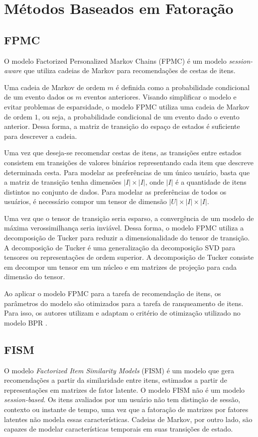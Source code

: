 \section{Métodos Baseados em Fatoração}

\subsection{FPMC}
O modelo Factorized Personalized Markov Chains (FPMC) é um modelo \textit{session-aware}
que utiliza cadeias de Markov para recomendações de cestas de itens. \cite{mkv}

Uma cadeia de Markov de ordem $m$ é definida como a probabilidade condicional de
um evento dados os $m$ eventos anteriores. Visando simplificar o modelo e evitar
problemas de esparsidade, o modelo FPMC utiliza uma cadeia de Markov de ordem
$1$, ou seja, a probabilidade condicional de um evento dado o evento anterior.
Dessa forma, a matriz de transição do espaço de estados é suficiente para
descrever a cadeia.

Uma vez que deseja-se recomendar cestas de itens, as transições entre estados
consistem em transições de valores binários representando cada item que descreve
determinada cesta. Para modelar as preferências de um único usuário, basta que a
matriz de transição tenha dimensões $|I| \times |I|$, onde $|I|$ é a quantidade
de itens distintos no conjunto de dados. Para modelar as preferências de todos
os usuários, é necessário compor um tensor de dimensão $|U|
\times |I| \times |I|$.

Uma vez que o tensor de transição seria esparso, a convergência de um modelo de
máxima verossimilhança seria inviável. Dessa forma, o modelo FPMC utiliza a
decomposição de Tucker para reduzir a dimensionalidade do tensor de transição. A
decomposição de Tucker é uma generalização da decomposição SVD para tensores ou
representações de ordem superior. A decomposição de Tucker consiste em decompor
um tensor em um núcleo e em matrizes de projeção para cada dimensão do tensor.

Ao aplicar o modelo FPMC para a tarefa de recomendação de itens, os parâmetros
do modelo são otimizados para a tarefa de ranqueamento de itens. Para isso, os
autores utilizam e adaptam o critério de otimização utilizado no modelo BPR
\cite{rendle2009}.

\subsection{FISM}
O modelo \textit{Factorized Item Similarity Models} (FISM) \cite{kabbur2013fism}
é um modelo que gera recomendações a partir da similaridade entre itens,
estimados a partir de representações em matrizes de fator latente. O modelo FISM
não é um modelo \textit{session-based}. Os itens avaliados por um usuário não
tem distinção de sessão, contexto ou instante de tempo, uma vez que a fatoração
de matrizes por fatores latentes não modela essas características. Cadeias de
Markov, por outro lado, são capazes de modelar características temporais em suas
transições de estado.


